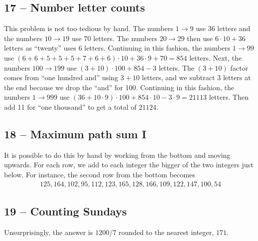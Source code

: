 \documentclass{article}
\begin{document}
\subsection*{17 -- Number letter counts} 
This problem is not too tedious by hand. 
The numbers $1 \to 9$ use 36 letters and the numbers $10 \to 19$ use 70 letters. 
The numbers $20 \to 29$ then use $6\cdot10 + 36$ letters as ``twenty'' uses 6 letters. 
Continuing in this fashion, the numbers $1 \to 99$ use $(6+6+5+5+5+7+6+6)\cdot10 + 36\cdot9 + 70 = 854$ letters. 
Next, the numbers $100 \to 199$ use $(3+10)\cdot100 + 854 - 3$ letters. 
The $(3+10)$ factor comes from ``one hundred and'' using $3 + 10$ letters, and we subtract 3 letters at the end because we drop the ``and'' for 100. Continuing in this fashion, the numbers $1 \to 999$ use $(36 + 10\cdot9)\cdot100 + 854\cdot10 - 3\cdot9 = 21113$ letters. Then add 11 for ``one thousand'' to get a total of $\boxed{ 21124 }$.


\subsection*{18 -- Maximum path sum I} 
It is possible to do this by hand by working from the bottom and moving upwards.
For each row, we add to each integer the bigger of the two integers just below.
For instance, the second row from the bottom becomes
\begin{align*}
	125, 164, 102, 95, 112, 123, 165, 128, 166, 109, 122, 147, 100, 54
\end{align*}


\subsection*{19 -- Counting Sundays} 
Unsurprisingly, the answer is $1200/7$ rounded to the nearest integer, $\boxed{171}$.
\end{document}
